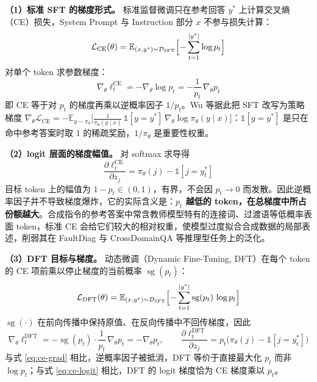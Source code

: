 \documentclass[fontset=fandol,type=master,campus=shenzhen,etitleauto=true]{hithesisbook}
\begin{document}
\textbf{（1）标准 SFT 的梯度形式。} 标准监督微调只在参考回答 $y^*$ 上计算交叉熵（CE）损失，System Prompt 与 Instruction 部分 $x$ 不参与损失计算：
\begin{equation}
\mathcal{L}_{\text{CE}}(\theta) = \mathbb{E}_{(x, y^*) \sim \mathcal{D}_{\text{SFT}}} \Bigl[ -\sum_{t=1}^{|y^*|} \log p_t \Bigr]
\end{equation}
对单个 token 求参数梯度：
\begin{equation}\label{eq:ce-grad}
\nabla_\theta \ell_t^{\text{CE}} = -\nabla_\theta \log p_t = -\frac{1}{p_t}\,\nabla_\theta p_t
\end{equation}
即 CE 等于对 $p_t$ 的梯度再乘以逆概率因子 $1/p_t$。Wu 等\cite{ref82}据此把 SFT 改写为策略梯度 $\nabla_\theta \mathcal{L}_{\text{CE}} = -\mathbb{E}_{y \sim \pi_\theta}\bigl[\tfrac{1}{\pi_\theta(y \mid x)}\,\mathbb{1}[y = y^*]\,\nabla_\theta \log \pi_\theta(y \mid x)\bigr]$：$\mathbb{1}[y = y^*]$ 是只在命中参考答案时取 1 的稀疏奖励，$1/\pi_\theta$ 是重要性权重。

\textbf{（2）logit 层面的梯度幅值。} 对 softmax 求导得
\begin{equation}\label{eq:ce-logit}
\frac{\partial \ell_t^{\text{CE}}}{\partial z_j} = \pi_\theta(j) - \mathbb{1}[j = y_t^*]
\end{equation}
目标 token 上的幅值为 $1 - p_t \in (0, 1)$，有界，不会因 $p_t \to 0$ 而发散。因此逆概率因子并不导致梯度爆炸，它的实际含义是：\textbf{$p_t$ 越低的 token，在总梯度中所占份额越大}。合成指令的参考答案中常含教师模型特有的连接词、过渡语等低概率表面 token，标准 CE 会给它们较大的相对权重，使模型过度拟合合成数据的局部表述，削弱其在 FaultDiag 与 CrossDomainQA 等推理型任务上的泛化。

\textbf{（3）DFT 目标与梯度。} 动态微调（Dynamic Fine-Tuning, DFT）\cite{ref82}在每个 token 的 CE 项前乘以停止梯度的当前概率 $\operatorname{sg}(p_t)$：
\begin{equation}
\mathcal{L}_{\text{DFT}}(\theta) = \mathbb{E}_{(x, y^*) \sim \mathcal{D}_{\text{SFT}}} \Bigl[ -\sum_{t=1}^{|y^*|} \operatorname{sg}(p_t)\,\log p_t \Bigr]
\end{equation}
$\operatorname{sg}(\cdot)$ 在前向传播中保持原值、在反向传播中不回传梯度，因此
\begin{equation}
\nabla_\theta \ell_t^{\text{DFT}} = -\operatorname{sg}(p_t) \cdot \frac{1}{p_t}\,\nabla_\theta p_t = -\nabla_\theta p_t, \qquad
\frac{\partial \ell_t^{\text{DFT}}}{\partial z_j} = p_t \bigl( \pi_\theta(j) - \mathbb{1}[j = y_t^*] \bigr)
\end{equation}
与式 \eqref{eq:ce-grad} 相比，逆概率因子被抵消，DFT 等价于直接最大化 $p_t$ 而非 $\log p_t$；与式 \eqref{eq:ce-logit} 相比，DFT 的 logit 梯度恰为 CE 梯度乘以 $p_t$。
\end{document}
